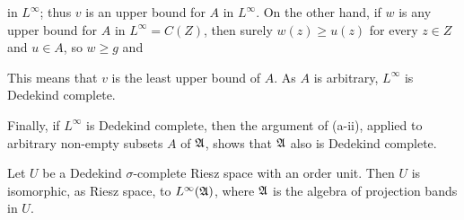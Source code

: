 {

\noindent in $L^{\infty}$;  thus $v$ is an upper bound for $A$ in
$L^{\infty}$.   On the other hand, if $w$ is any upper bound for $A$ in
$L^{\infty}=C(Z)$, then surely $w(z)\ge u(z)$ for every $z\in Z$ and
$u\in A$, so $w\ge g$ and


\noindent This means that $v$ is the least upper bound of $A$.   As $A$
is arbitrary, $L^{\infty}$ is Dedekind complete.

\medskip

 Finally, if $L^{\infty}$ is Dedekind complete, then the
argument of (a-ii), applied to arbitrary non-empty subsets $A$ of
$\frak A$, shows that $\frak A$ also is Dedekind complete.
}%

 Let $U$ be a Dedekind $\sigma$-complete
Riesz space with an order unit.   Then $U$ is isomorphic, as Riesz
space, to $L^{\infty}(\frak A)$, where $\frak A$ is the algebra of
projection bands in $U$.

